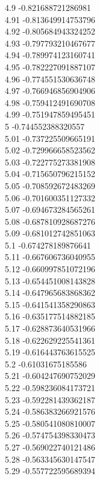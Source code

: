 {4.9	-0.821688721286981\\
4.91	-0.813649914753796\\
4.92	-0.805684943324252\\
4.93	-0.797793210467677\\
4.94	-0.789974123160741\\
4.95	-0.782227091887107\\
4.96	-0.774551530636748\\
4.97	-0.766946856904906\\
4.98	-0.759412491690708\\
4.99	-0.751947859495451\\
5	-0.744552388320557\\
5.01	-0.737225509665191\\
5.02	-0.729966658523562\\
5.03	-0.722775273381908\\
5.04	-0.715650796215152\\
5.05	-0.708592672483269\\
5.06	-0.701600351127332\\
5.07	-0.694673284565261\\
5.08	-0.687810928687276\\
5.09	-0.681012742851063\\
5.1	-0.674278189876641\\
5.11	-0.667606736040955\\
5.12	-0.660997851072196\\
5.13	-0.654451008143828\\
5.14	-0.647965683868362\\
5.15	-0.641541358290863\\
5.16	-0.635177514882185\\
5.17	-0.628873640531966\\
5.18	-0.622629225541361\\
5.19	-0.616443763615525\\
5.2	-0.61031675185586\\
5.21	-0.604247690752029\\
5.22	-0.598236084173721\\
5.23	-0.592281439362187\\
5.24	-0.586383266921576\\
5.25	-0.580541080810007\\
5.26	-0.574754398330473\\
5.27	-0.569022740121486\\
5.28	-0.563345630147547\\
5.29	-0.557722595689394\\
}

